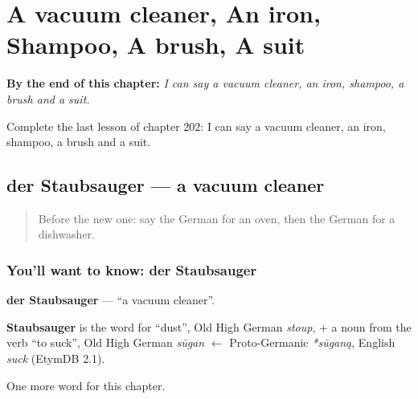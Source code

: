 
\chapter{A vacuum cleaner, An iron, Shampoo, A brush, A suit}
\label{ch:ge-a-vacuum-cleaner-an-iron-shampoo-a-brush-a-suit}

\begin{chapteropening}
\textbf{By the end of this chapter:} \emph{I can say a vacuum cleaner, an iron, shampoo, a brush and a suit.}

Complete the last lesson of chapter 202: I can say a vacuum cleaner, an iron, shampoo, a brush and a suit.
\end{chapteropening}

\section[der Staubsauger]{der Staubsauger — a vacuum cleaner}

\label{lesson:GE-C202-staubsauger}



\begin{quote}
Before the new one: say the German for an oven, then the German for a dishwasher.
\end{quote}

\subsection*{You'll want to know: der Staubsauger}
\textbf{der Staubsauger} — \textquotedblleft{}a vacuum cleaner\textquotedblright{}.

\begin{cousinweb}
\textbf{Staubsauger} is the word for \textquotedblleft{}dust\textquotedblright{}, Old High German \emph{stoup}, + a noun from the verb \textquotedblleft{}to suck\textquotedblright{}, Old High German \emph{sūgan} $\leftarrow$ Proto-Germanic \emph{*sūganą}, English \emph{suck} (EtymDB 2.1).
\end{cousinweb}

\begin{grammarlens}[title={What you've built}]
One more word for this chapter.
\end{grammarlens}

